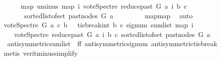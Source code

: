 \begin{isabellebody}
\ \ \ \ \ {\isacharequal}{\kern0pt}\ {\isacharparenleft}{\kern0pt}map\ uminus\ {\isacharparenleft}{\kern0pt}map\ {\isacharparenleft}{\kern0pt}{\isasymlambda}i{\isachardot}{\kern0pt}\ vote{\isacharunderscore}{\kern0pt}Spectre\ {\isacharparenleft}{\kern0pt}reduce{\isacharunderscore}{\kern0pt}past\ G\ a{\isacharparenright}{\kern0pt}\ i\ b\ c{\isacharparenright}{\kern0pt}\isanewline
\ \ \ \ \ \ \ {\isacharparenleft}{\kern0pt}sorted{\isacharunderscore}{\kern0pt}list{\isacharunderscore}{\kern0pt}of{\isacharunderscore}{\kern0pt}set\ {\isacharparenleft}{\kern0pt}past{\isacharunderscore}{\kern0pt}nodes\ G\ a{\isacharparenright}{\kern0pt}{\isacharparenright}{\kern0pt}{\isacharparenright}{\kern0pt}{\isacharparenright}{\kern0pt}{\isachardoublequoteclose}\ \isanewline
\ \ \ \ \ \ \isamarkupfalse%
\ map{\isacharunderscore}{\kern0pt}map\ \isamarkupfalse%
\ auto\ \ \ \ \ \ \ \isanewline
\ \ \ \ \isamarkupfalse%
\ \isamarkupfalse%
\ {\isachardoublequoteopen}vote{\isacharunderscore}{\kern0pt}Spectre\ G\ a\ c\ b\ {\isacharequal}{\kern0pt}\ {\isacharminus}{\kern0pt}\ {\isacharparenleft}{\kern0pt}tie{\isacharunderscore}{\kern0pt}break{\isacharunderscore}{\kern0pt}int\ b\ c\ {\isacharparenleft}{\kern0pt}signum\ {\isacharparenleft}{\kern0pt}sum{\isacharunderscore}{\kern0pt}list\ {\isacharparenleft}{\kern0pt}map\ {\isacharparenleft}{\kern0pt}{\isasymlambda}i{\isachardot}{\kern0pt}\isanewline
\ \ \ \ {\isacharparenleft}{\kern0pt}vote{\isacharunderscore}{\kern0pt}Spectre\ {\isacharparenleft}{\kern0pt}reduce{\isacharunderscore}{\kern0pt}past\ G\ a{\isacharparenright}{\kern0pt}\ i\ b\ c{\isacharparenright}{\kern0pt}{\isacharparenright}{\kern0pt}\ {\isacharparenleft}{\kern0pt}sorted{\isacharunderscore}{\kern0pt}list{\isacharunderscore}{\kern0pt}of{\isacharunderscore}{\kern0pt}set\ {\isacharparenleft}{\kern0pt}past{\isacharunderscore}{\kern0pt}nodes\ G\ a{\isacharparenright}{\kern0pt}{\isacharparenright}{\kern0pt}{\isacharparenright}{\kern0pt}{\isacharparenright}{\kern0pt}{\isacharparenright}{\kern0pt}{\isacharparenright}{\kern0pt}{\isachardoublequoteclose}\ \isanewline
\ \ \ \ \ \ \isamarkupfalse%
\ \ antisymmetric{\isacharunderscore}{\kern0pt}sumlist\ {}\ ff{}\ antisymmetric{\isacharunderscore}{\kern0pt}signum\ antisymmetric{\isacharunderscore}{\kern0pt}tie{\isacharunderscore}{\kern0pt}break\isanewline
\ \ \ \ \ \ \isamarkupfalse%
\ {\isacharparenleft}{\kern0pt}metis\ verit{\isacharunderscore}{\kern0pt}minus{\isacharunderscore}{\kern0pt}simplify{\isacharparenleft}{\kern0pt}{}{\isacharparenright}{\kern0pt}{\isacharparenright}{\kern0pt}\ \isanewline

\end{isabellebody}
